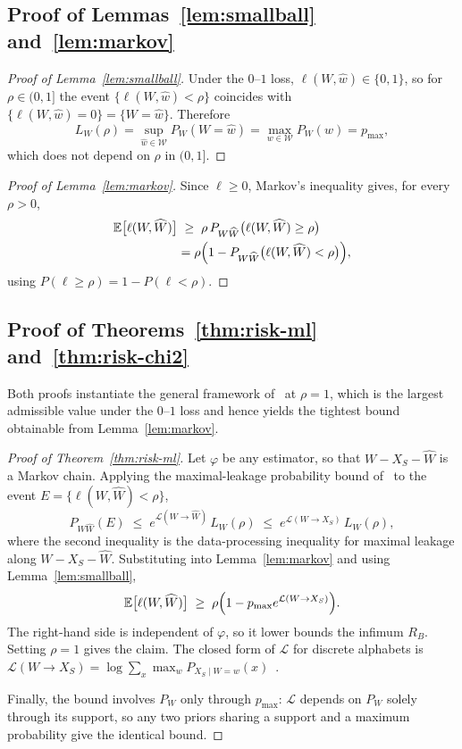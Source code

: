 \documentclass[journal]{IEEEtran}
\theoremstyle{definition}
\theoremstyle{remark}
\begin{document}
\subsection{Proof of Lemmas~\ref{lem:smallball}
and~\ref{lem:markov}}
\label{app:proof-lemmas}

\begin{proof}[Proof of Lemma~\ref{lem:smallball}]
Under the $0$--$1$ loss, $\ell(W,\hat{w})\in\{0,1\}$, so
for $\rho\in(0,1]$ the event $\{\ell(W,\hat w)<\rho\}$
coincides with $\{\ell(W,\hat w)=0\}=\{W=\hat w\}$.
Therefore
\[
  L_W(\rho)
  =\sup_{\hat w\in\mathcal{W}} P_W(W=\hat w)
  =\max_{w\in\mathcal{W}} P_W(w)
  =p_{\max},
\]
which does not depend on $\rho$ in $(0,1]$.
\end{proof}

\begin{proof}[Proof of Lemma~\ref{lem:markov}]
Since $\ell\ge0$, Markov's inequality gives, for every
$\rho>0$,
\begin{align*}
  \mathbb{E}\bigl[\ell(W,\widehat W)\bigr]
  &\;\ge\; \rho\,
     P_{W\widehat W}\bigl(\ell(W,\widehat W)\ge\rho\bigr)\\
  &= \rho\Bigl(1-P_{W\widehat W}
     \bigl(\ell(W,\widehat W)<\rho\bigr)\Bigr),
\end{align*}
using $P(\ell\ge\rho)=1-P(\ell<\rho)$.
\end{proof}

\subsection{Proof of Theorems~\ref{thm:risk-ml}
and~\ref{thm:risk-chi2}}
\label{app:proof-risk-bounds}

Both proofs instantiate the general framework
of~\cite{esposito2024lower} at $\rho=1$, which is the
largest admissible value under the $0$--$1$ loss and hence
yields the tightest bound obtainable from
Lemma~\ref{lem:markov}.

\begin{proof}[Proof of Theorem~\ref{thm:risk-ml}]
Let $\varphi$ be any estimator, so that
$W-X_S-\widehat W$ is a Markov chain. Applying the
maximal-leakage probability bound
of~\cite{esposito2024lower} to the event
$E=\{\ell(W,\widehat W)<\rho\}$,
\[
  P_{W\widehat W}(E)
  \;\le\; e^{\mathcal{L}(W\to\widehat W)}\,L_W(\rho)
  \;\le\; e^{\mathcal{L}(W\to X_S)}\,L_W(\rho),
\]
where the second inequality is the data-processing
inequality for maximal leakage along
$W-X_S-\widehat W$. Substituting into
Lemma~\ref{lem:markov} and using
Lemma~\ref{lem:smallball},
\[
  \mathbb{E}\bigl[\ell(W,\widehat W)\bigr]
  \;\ge\;
  \rho\Bigl(1-p_{\max}e^{\mathcal{L}(W\to X_S)}\Bigr).
\]
The right-hand side is independent of $\varphi$, so it
lower bounds the infimum $R_B$. Setting $\rho=1$ gives the
claim. The closed form of $\mathcal{L}$ for discrete
alphabets is
$\mathcal{L}(W\to X_S)=\log\sum_x\max_w
P_{X_S\mid W=w}(x)$~\cite{esposito2024lower}.

Finally, the bound involves $P_W$ only through
$p_{\max}$: $\mathcal{L}$ depends on $P_W$ solely through
its support, so any two priors sharing a support and a
maximum probability give the identical bound.
\end{proof}
\end{document}
